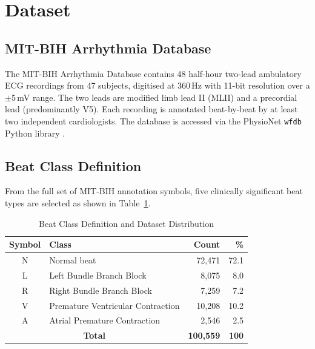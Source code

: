 \documentclass[conference]{IEEEtran}
\begin{document}
\section{Dataset}

\subsection{MIT-BIH Arrhythmia Database}

The MIT-BIH Arrhythmia Database \cite{b14} contains 48 half-hour two-lead ambulatory ECG recordings from 47 subjects, digitised at 360\,Hz with 11-bit resolution over a $\pm$5\,mV range. The two leads are modified limb lead II (MLII) and a precordial lead (predominantly V5). Each recording is annotated beat-by-beat by at least two independent cardiologists. The database is accessed via the PhysioNet \texttt{wfdb} Python library \cite{b15}.

\subsection{Beat Class Definition}

From the full set of MIT-BIH annotation symbols, five clinically significant beat types are selected as shown in Table~\ref{tab:classes}.

\begin{table}[htbp]
\caption{Beat Class Definition and Dataset Distribution}
\begin{center}
\begin{tabular}{|c|l|r|r|}
\hline
\textbf{Symbol} & \textbf{Class} & \textbf{Count} & \textbf{\%} \\
\hline
N & Normal beat              & 72,471 & 72.1 \\
\hline
L & Left Bundle Branch Block & 8,075  & 8.0  \\
\hline
R & Right Bundle Branch Block & 7,259  & 7.2  \\
\hline
V & Premature Ventricular Contraction & 10,208 & 10.2 \\
\hline
A & Atrial Premature Contraction & 2,546 & 2.5 \\
\hline
\multicolumn{2}{|c|}{\textbf{Total}} & \textbf{100,559} & \textbf{100} \\
\hline
\end{tabular}
\label{tab:classes}
\end{center}
\end{table}
\end{document}
